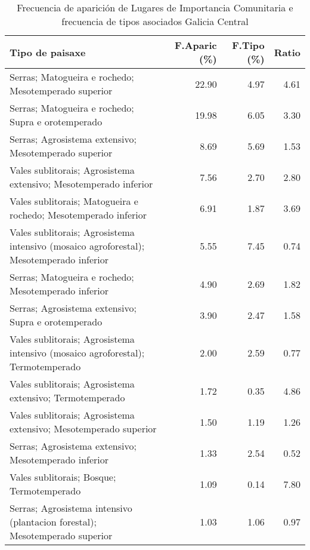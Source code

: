 \begin{table}[p]
\centering
\caption{Frecuencia de aparición de Lugares de Importancia Comunitaria e frecuencia de tipos asociados Galicia Central} 
\label{vnatura7}
\begin{tabular}{lrrr}
  \hline
Tipo de paisaxe & F.Aparic (\%) & F.Tipo (\%) & Ratio \\ 
  \hline
Serras; Matogueira e rochedo; Mesotemperado superior & 22.90 & 4.97 & 4.61 \\ 
  Serras; Matogueira e rochedo; Supra e orotemperado & 19.98 & 6.05 & 3.30 \\ 
  Serras; Agrosistema extensivo; Mesotemperado superior & 8.69 & 5.69 & 1.53 \\ 
  Vales sublitorais; Agrosistema extensivo; Mesotemperado inferior & 7.56 & 2.70 & 2.80 \\ 
  Vales sublitorais; Matogueira e rochedo; Mesotemperado inferior & 6.91 & 1.87 & 3.69 \\ 
  Vales sublitorais; Agrosistema intensivo (mosaico agroforestal); Mesotemperado inferior & 5.55 & 7.45 & 0.74 \\ 
  Serras; Matogueira e rochedo; Mesotemperado inferior & 4.90 & 2.69 & 1.82 \\ 
  Serras; Agrosistema extensivo; Supra e orotemperado & 3.90 & 2.47 & 1.58 \\ 
  Vales sublitorais; Agrosistema intensivo (mosaico agroforestal); Termotemperado & 2.00 & 2.59 & 0.77 \\ 
  Vales sublitorais; Agrosistema extensivo; Termotemperado & 1.72 & 0.35 & 4.86 \\ 
  Vales sublitorais; Agrosistema extensivo; Mesotemperado superior & 1.50 & 1.19 & 1.26 \\ 
  Serras; Agrosistema extensivo; Mesotemperado inferior & 1.33 & 2.54 & 0.52 \\ 
  Vales sublitorais; Bosque; Termotemperado & 1.09 & 0.14 & 7.80 \\ 
  Serras; Agrosistema intensivo (plantacion forestal); Mesotemperado superior & 1.03 & 1.06 & 0.97 \\ 
   \hline
\end{tabular}
\end{table}
